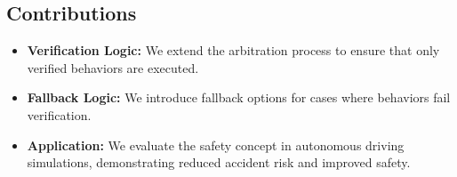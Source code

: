 \subsection{Contributions}

\begin{itemize}
\item \textbf{Verification Logic:} We extend the arbitration process to ensure that only verified behaviors are executed.
\item \textbf{Fallback Logic:} We introduce fallback options for cases where behaviors fail verification.
\item \textbf{Application:} We evaluate the safety concept in autonomous driving simulations, demonstrating reduced accident risk and improved safety.
\end{itemize}
